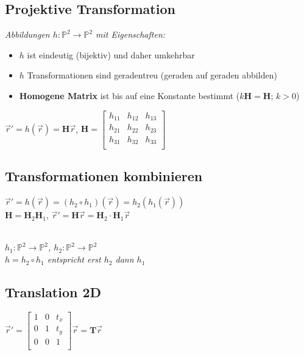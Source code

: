 

\subsection{Projektive Transformation}

\textit{
    Abbildungen $h: \mathbb{P}^2 \rightarrow \mathbb{P}^2$
    mit Eigenschaften:
}

\begin{itemize}
    \item $h$ ist eindeutig (bijektiv) und daher umkehrbar
    \item $h$ Transformationen sind geradentreu (geraden auf geraden abbilden)
    \item \textbf{Homogene Matrix} ist bis auf eine Konstante bestimmt ($k\mathbf{H} = \mathbf{H}$; $k > 0$)
\end{itemize}

$\vec{r}' = h(\vec{r}) = \mathbf{H} \vec{r}$, $\mathbf{H} = \begin{bmatrix}
    h_{11} & h_{12} & h_{13} \\
    h_{21} & h_{22} & h_{23} \\
    h_{31} & h_{32} & h_{33} \\
\end{bmatrix}$

\subsection{Transformationen kombinieren}

$\vec{r} ' = h(\vec{r}) = (h_2 \circ h_1)(\vec{r}) = h_2(h_1(\vec{r}))$\\

$\mathbf{H} = \mathbf{H}_2\mathbf{H}_1$,
$\vec{r} ' = \mathbf{H}\vec{r} = \mathbf{H}_2 \cdot \mathbf{H}_1\vec{r}$

\textit{\\
    $h_1: \mathbb{P}^2 \rightarrow \mathbb{P}^2$,
    $h_2: \mathbb{P}^2 \rightarrow \mathbb{P}^2$ \\
    $h = h_2 \circ h_1$ entspricht erst $h_2$ dann $h_1$
}

\subsection{Translation 2D}

$\vec{r} ' = \left[\begin{array}{cc|c}
    1 & 0 & t_x \\
    0 & 1 & t_y \\
    \hline
    0 & 0 & 1 \\
\end{array}\right]
\vec{r} = \mathbf{T} \vec{r}$ \\

